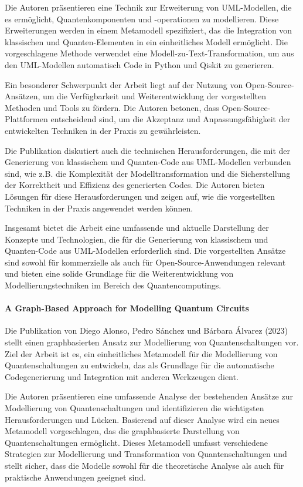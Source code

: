Die Autoren präsentieren eine Technik zur Erweiterung von UML-Modellen, die es ermöglicht, Quantenkomponenten 
und -operationen zu modellieren. Diese Erweiterungen werden in einem Metamodell spezifiziert, das die Integration 
von klassischen und Quanten-Elementen in ein einheitliches Modell ermöglicht. Die vorgeschlagene Methode verwendet 
eine Modell-zu-Text-Transformation, um aus den UML-Modellen automatisch Code in Python und Qiskit zu generieren.

Ein besonderer Schwerpunkt der Arbeit liegt auf der Nutzung von Open-Source-Ansätzen, um die Verfügbarkeit und 
Weiterentwicklung der vorgestellten Methoden und Tools zu fördern. Die Autoren betonen, dass Open-Source-Plattformen 
entscheidend sind, um die Akzeptanz und Anpassungsfähigkeit der entwickelten Techniken in der Praxis zu gewährleisten.

Die Publikation diskutiert auch die technischen Herausforderungen, die mit der Generierung von klassischem und 
Quanten-Code aus UML-Modellen verbunden sind, wie z.B. die Komplexität der Modelltransformation und die Sicherstellung 
der Korrektheit und Effizienz des generierten Codes. Die Autoren bieten Lösungen für diese Herausforderungen und 
zeigen auf, wie die vorgestellten Techniken in der Praxis angewendet werden können.

Insgesamt bietet die Arbeit eine umfassende und aktuelle Darstellung der Konzepte und Technologien, die für die 
Generierung von klassischem und Quanten-Code aus UML-Modellen erforderlich sind. Die vorgestellten Ansätze sind 
sowohl für kommerzielle als auch für Open-Source-Anwendungen relevant und bieten eine solide Grundlage für die 
Weiterentwicklung von Modellierungstechniken im Bereich des Quantencomputings.

\paragraph{A Graph-Based Approach for Modelling Quantum Circuits}

Die Publikation von Diego Alonso, Pedro Sánchez und Bárbara Álvarez (2023) \cite{alonso2023graph} stellt einen graphbasierten Ansatz zur 
Modellierung von Quantenschaltungen vor. Ziel der Arbeit ist es, ein einheitliches Metamodell für die Modellierung 
von Quantenschaltungen zu entwickeln, das als Grundlage für die automatische Codegenerierung und Integration mit 
anderen Werkzeugen dient.

Die Autoren präsentieren eine umfassende Analyse der bestehenden Ansätze zur Modellierung von Quantenschaltungen 
und identifizieren die wichtigsten Herausforderungen und Lücken. Basierend auf dieser Analyse wird ein neues Metamodell 
vorgeschlagen, das die graphbasierte Darstellung von Quantenschaltungen ermöglicht. Dieses Metamodell umfasst 
verschiedene Strategien zur Modellierung und Transformation von Quantenschaltungen und stellt sicher, dass die 
Modelle sowohl für die theoretische Analyse als auch für praktische Anwendungen geeignet sind.

